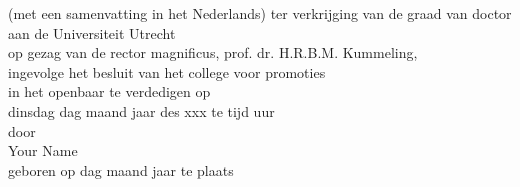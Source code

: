 \begin{titlepage}
    \begin{addmargin}[-1cm]{-3cm}
        \begin{center}
            \large
            {\color{CTtitle}\bfseries\spacedallcaps{\myTitle}\par}
            \bigskip
            \bigskip
            \bigskip
            \bigskip
            \bigskip
            {\par}
            \bigskip
            (met een samenvatting in het Nederlands)
            \vfill
            \vfill
            ter verkrijging van de graad van doctor aan de Universiteit Utrecht \\
            op gezag van de rector magnificus, prof. dr. H.R.B.M. Kummeling, \\
            ingevolge het besluit van het college voor promoties \\
            in het openbaar te verdedigen op \\
            \bigskip
            \bigskip
            dinsdag dag maand jaar des xxx te tijd uur \\
            \bigskip
            \bigskip
            \bigskip
            door \\
            \bigskip
            \bigskip
            Your Name \\
            \bigskip
            geboren op dag maand jaar te plaats
        \end{center}
    \end{addmargin}
\end{titlepage}
